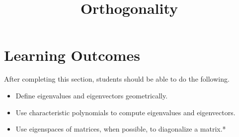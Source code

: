 \documentclass{ximera}
\title{Orthogonality}
\begin{document}
\begin{abstract}

\end{abstract}
 
\maketitle
 
\section*{Learning Outcomes}
After completing this section, students should be able to do the following.
 
\begin{itemize}
    \item Define eigenvalues and eigenvectors geometrically.
    \item Use characteristic polynomials to compute eigenvalues and eigenvectors. 
    \item Use eigenspaces of matrices, when possible, to diagonalize a matrix.*
 
\end{itemize}

 
\end{document}
